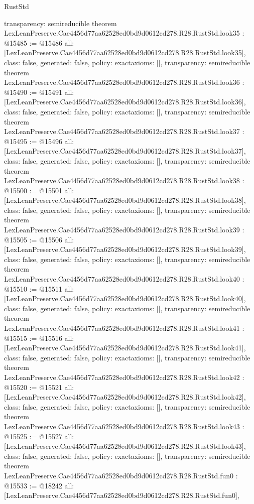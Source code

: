 \begin{lexlean}{RustStd}
\begin{coremodule}
{  transparency: semireducible
}
theorem LexLeanPreserve.Cae4456d77aa62528ed0bd9d0612cd278.R28.RustStd.look35 : @15485 := @15486 {
  all: [LexLeanPreserve.Cae4456d77aa62528ed0bd9d0612cd278.R28.RustStd.look35],
  class: false,
  generated: false,
  policy: exact{axioms: []},
  transparency: semireducible
}
theorem LexLeanPreserve.Cae4456d77aa62528ed0bd9d0612cd278.R28.RustStd.look36 : @15490 := @15491 {
  all: [LexLeanPreserve.Cae4456d77aa62528ed0bd9d0612cd278.R28.RustStd.look36],
  class: false,
  generated: false,
  policy: exact{axioms: []},
  transparency: semireducible
}
theorem LexLeanPreserve.Cae4456d77aa62528ed0bd9d0612cd278.R28.RustStd.look37 : @15495 := @15496 {
  all: [LexLeanPreserve.Cae4456d77aa62528ed0bd9d0612cd278.R28.RustStd.look37],
  class: false,
  generated: false,
  policy: exact{axioms: []},
  transparency: semireducible
}
theorem LexLeanPreserve.Cae4456d77aa62528ed0bd9d0612cd278.R28.RustStd.look38 : @15500 := @15501 {
  all: [LexLeanPreserve.Cae4456d77aa62528ed0bd9d0612cd278.R28.RustStd.look38],
  class: false,
  generated: false,
  policy: exact{axioms: []},
  transparency: semireducible
}
theorem LexLeanPreserve.Cae4456d77aa62528ed0bd9d0612cd278.R28.RustStd.look39 : @15505 := @15506 {
  all: [LexLeanPreserve.Cae4456d77aa62528ed0bd9d0612cd278.R28.RustStd.look39],
  class: false,
  generated: false,
  policy: exact{axioms: []},
  transparency: semireducible
}
theorem LexLeanPreserve.Cae4456d77aa62528ed0bd9d0612cd278.R28.RustStd.look40 : @15510 := @15511 {
  all: [LexLeanPreserve.Cae4456d77aa62528ed0bd9d0612cd278.R28.RustStd.look40],
  class: false,
  generated: false,
  policy: exact{axioms: []},
  transparency: semireducible
}
theorem LexLeanPreserve.Cae4456d77aa62528ed0bd9d0612cd278.R28.RustStd.look41 : @15515 := @15516 {
  all: [LexLeanPreserve.Cae4456d77aa62528ed0bd9d0612cd278.R28.RustStd.look41],
  class: false,
  generated: false,
  policy: exact{axioms: []},
  transparency: semireducible
}
theorem LexLeanPreserve.Cae4456d77aa62528ed0bd9d0612cd278.R28.RustStd.look42 : @15520 := @15521 {
  all: [LexLeanPreserve.Cae4456d77aa62528ed0bd9d0612cd278.R28.RustStd.look42],
  class: false,
  generated: false,
  policy: exact{axioms: []},
  transparency: semireducible
}
theorem LexLeanPreserve.Cae4456d77aa62528ed0bd9d0612cd278.R28.RustStd.look43 : @15525 := @15527 {
  all: [LexLeanPreserve.Cae4456d77aa62528ed0bd9d0612cd278.R28.RustStd.look43],
  class: false,
  generated: false,
  policy: exact{axioms: []},
  transparency: semireducible
}
theorem LexLeanPreserve.Cae4456d77aa62528ed0bd9d0612cd278.R28.RustStd.fun0 : @15533 := @18242 {
  all: [LexLeanPreserve.Cae4456d77aa62528ed0bd9d0612cd278.R28.RustStd.fun0],
}
\end{coremodule}
\end{lexlean}

